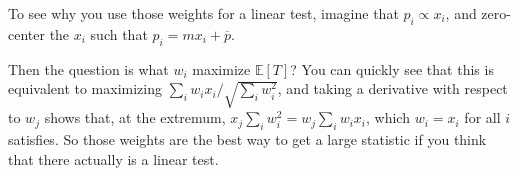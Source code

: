 To see why you use those weights for a linear test, imagine that
\(p_i \propto x_i\), and zero-center the \(x_i\) such that
\(p_i = m x_i + \overline{p}\).

Then the question is what \(w_i\) maximize \(\mathbb{E}[T]\)? You can
quickly see that this is equivalent to maximizing
\(\sum_i w_i x_i / \sqrt{\sum_i w_i^2}\), and taking a derivative with
respect to \(w_j\) shows that, at the extremum,
\(x_j \sum_i w_i^2 = w_j \sum_i w_i x_i\), which \(w_i = x_i\) for all
\(i\) satisfies. So those weights are the best way to get a large
statistic if you think that there actually is a linear test.
